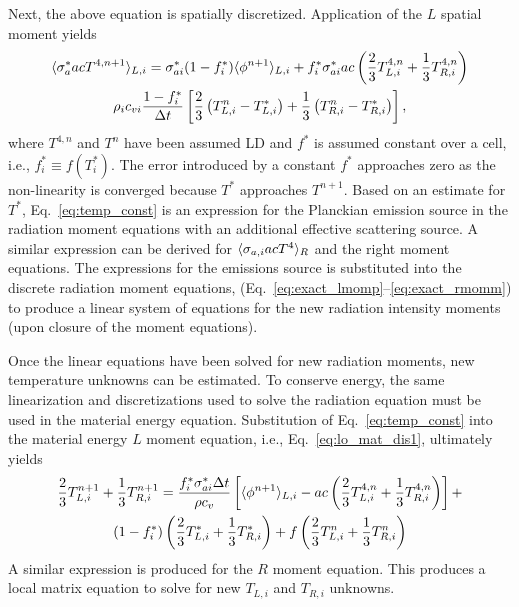 Next, the above equation is spatially discretized.  Application of the $L$ spatial
moment yields
\begin{multline}\label{eq:temp_const}
    \langle \sigma_a^* a c T^{4,n+1} \rangle_{L,i} = \sigma^*_{ai}(1-f_i^*)\langle \phi^{n+1} \rangle_{L,i} +
    f_i^*
    \sigma^*_{ai} a c \left(\frac{2}{3} T_{L,i}^{4,n} + \frac{1}{3} T_{R,i}^{4,n}\right)
    \\ \rho_i c_{vi} \frac{1 - f^*_i}{\Delta t} \left[\frac{2}{3}\left(T^n_{L,i} -
        T^*_{L,i}\right) + \frac{1}{3}\left(T^n_{R,i} -
    T^*_{R,i}\right)\right],
\end{multline}
where $T^{4,n}$ and $T^{n}$ have been assumed LD and $f^*$ is assumed constant over a cell, i.e., $f^*_i
\equiv f(T_i^*)$.
The error introduced by a constant $f^*$ approaches zero as the
non-linearity is converged because $T^*$ approaches $T^{n+1}$. 
Based on an estimate for $T^*$, Eq.~\eqref{eq:temp_const} is an expression for
the Planckian emission source in the radiation moment equations with an additional effective scattering source.
A similar expression can be derived for $\langle \sigma_{a,i} a c T^4 \rangle_R$ and the right
moment equations.
The expressions for the emissions source is substituted into the discrete radiation moment equations,
(Eq.~\eqref{eq:exact_lmomp}--\eqref{eq:exact_rmomm}) to produce a
linear system of equations for the new radiation intensity moments (upon closure of the moment equations). 

Once the linear equations have been solved for new radiation moments, new temperature
unknowns can be estimated.  To conserve energy, the same linearization and discretizations used to
solve the radiation equation must be used in the material energy equation.
Substitution of Eq.~\eqref{eq:temp_const} into the material energy $L$ moment equation, i.e., Eq.~\eqref{eq:lo_mat_dis1},
ultimately yields
\begin{multline}\label{eq:new_temp}
    \frac{2}{3}T_{L,i}^{n+1} + \frac{1}{3}T_{R,i}^{n+1}= \frac{f_i^* \sigma_{ai}^* \Delta
t}{\rho c_{v}}  \left[ \langle \phi^{n+1} \rangle_{L,i}  - a c\left(\frac{2}{3} T_{L,i}^{4,n} + \frac{1}{3} T_{R,i}^{4,n}\right)
\right] + \\ (1- f^*_{i})\left(\frac{2}{3}T^*_{L,i} + \frac{1}{3}T^*_{R,i}\right) + f
\left(\frac{2}{3}T^n_{L,i} + \frac{1}{3}T^n_{R,i}\right)
\end{multline}
A similar expression is produced for the $R$ moment equation.  This produces a local
matrix equation to solve for new $T_{L,i}$ and $T_{R,i}$ unknowns.  

